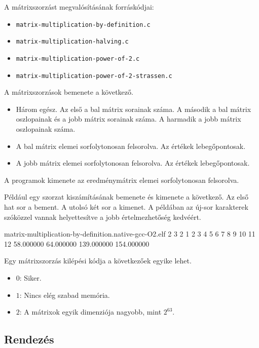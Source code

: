\documentclass[12pt]{report}
\begin{document}
A mátrixszorzást megvalósításának forráskódjai:
\begin{itemize}
\item \texttt{matrix-multiplication-by-definition.c}
\item \texttt{matrix-multiplication-halving.c}
\item \texttt{matrix-multiplication-power-of-2.c}
\item \texttt{matrix-multiplication-power-of-2-strassen.c}
\end{itemize}

A mátrixszorzások bemenete a következő.
\begin{itemize}
\item Három egész. Az első a bal mátrix sorainak száma.
A második a bal mátrix oszlopainak és a jobb mátrix sorainak száma.
A harmadik a jobb mátrix oszlopainak száma.
\item A bal mátrix elemei sorfolytonosan felsorolva. Az értékek lebegőpontosak.
\item A jobb mátrix elemei sorfolytonosan felsorolva. Az értékek lebegőpontosak.
\end{itemize}
A programok kimenete az eredménymátrix elemei sorfolytonosan felsorolva.

Például egy szorzat kiszámításának bemenete és kimenete a következő.
Az első hat sor a bement. A utolsó két sor a kimenet.
A példában az új-sor karakterek szóközzel vannak helyettesítve
a jobb értelmezhetőség kedvéért.
\begin{table}[ht]
\centering
\caption{A mátrixszorzás futtatásának példája}
\label{table-mm-example-run}
\begin{boxedverbatim}
matrix-multiplication-by-definition.native-gcc-O2.elf 
2 3 2
1 2 3
4 5 6
7 8
9 10
11 12
58.000000 64.000000
139.000000 154.000000
\end{boxedverbatim}
\end{table}

Egy mátrixszorzás kilépési kódja a következőek egyike lehet.
\begin{itemize}
\item $0$: Siker.
\item $1$: Nincs elég szabad memória.
\item $2$: A mátrixok egyik dimenziója nagyobb, mint $2^{63}$.
\end{itemize}

\subsection{Rendezés}
\end{document}
